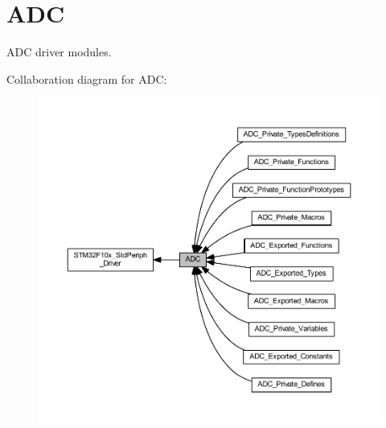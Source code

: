 \hypertarget{group___a_d_c}{}\section{A\+DC}
\label{group___a_d_c}


A\+DC driver modules.  


Collaboration diagram for A\+DC\+:
\nopagebreak
\begin{figure}[H]
\begin{center}
\leavevmode
\includegraphics[width=350pt]{group___a_d_c}
\end{center}
\end{figure}
